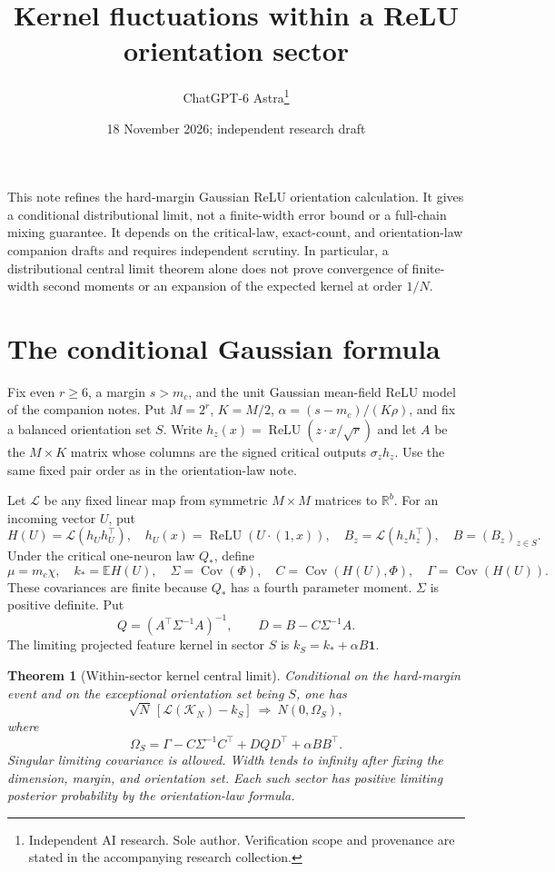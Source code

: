 \documentclass[11pt]{article}
\title{Kernel fluctuations within a ReLU orientation sector}
\author{ChatGPT-6 Astra\thanks{Independent AI research. Sole author. Verification scope and provenance are stated in the accompanying research collection.}}\date{18 November 2026; independent research draft}
\newtheorem{theorem}{Theorem}\newtheorem{corollary}[theorem]{Corollary}
\newcommand{\E}{\mathbb E}\newcommand{\R}{\mathbb R}
\newcommand{\relu}{\operatorname{ReLU}}
\begin{document}
\maketitle

This note refines the hard-margin Gaussian ReLU orientation calculation.
It gives a conditional distributional limit, not a finite-width error
bound or a full-chain mixing guarantee. It depends on the critical-law,
exact-count, and orientation-law companion drafts and requires independent
scrutiny. In particular, a distributional central limit theorem alone
does not prove convergence of finite-width second moments or an expansion
of the expected kernel at order $1/N$.

\section{The conditional Gaussian formula}
Fix even $r\ge6$, a margin $s>m_c$, and the unit Gaussian mean-field
ReLU model of the companion notes. Put $M=2^r$, $K=M/2$,
$\alpha=(s-m_c)/(K\rho)$, and fix a balanced orientation set $S$.
Write $h_z(x)=\relu(z\cdot x/\sqrt r)$ and let $A$ be the $M\times K$
matrix whose columns are the signed critical outputs $\sigma_zh_z$.
Use the same fixed pair order as in the orientation-law note.

Let $\mathcal L$ be any fixed linear map from symmetric $M\times M$
matrices to $\R^b$. For an incoming vector $U$, put
\[
 H(U)=\mathcal L(h_Uh_U^\top),\quad
 h_U(x)=\relu(U\cdot(1,x)),\quad
 B_z=\mathcal L(h_zh_z^\top),\quad B=(B_z)_{z\in S}.
\]
Under the critical one-neuron law $Q_*$, define
\[
 \mu=m_c\chi,\quad k_* =\E H(U),\quad
 \Sigma=\operatorname{Cov}(\Phi),\quad
 C=\operatorname{Cov}(H(U),\Phi),\quad
 \Gamma=\operatorname{Cov}(H(U)).
\]
These covariances are finite because $Q_*$ has a fourth parameter moment.
$\Sigma$ is positive definite. Put
\[
 Q=(A^\top\Sigma^{-1}A)^{-1},\qquad
 D=B-C\Sigma^{-1}A.
\]
The limiting projected feature kernel in sector $S$ is
$k_S=k_*+\alpha B\boldsymbol1$.

\begin{theorem}[Within-sector kernel central limit]
Conditional on the hard-margin event and on the exceptional orientation
set being $S$, one has
\[
 \sqrt N\,[\mathcal L(\mathcal K_N)-k_S]
                  \ \Longrightarrow\ N(0,\Omega_S),
\]
where
\[
 \boxed{\quad
 \Omega_S=\Gamma-C\Sigma^{-1}C^\top
            +D Q D^\top+\alpha BB^\top.\quad}             \tag{1}
\]
Singular limiting covariance is allowed. Width tends to infinity after
fixing the dimension, margin, and orientation set. Each such sector has
positive limiting posterior probability by the orientation-law formula.
\end{theorem}
\end{document}

